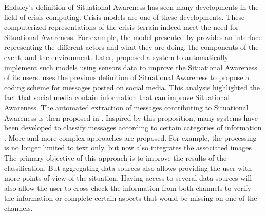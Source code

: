 Endsley's definition of Situational Awareness has seen many developments in the field of crisis computing.
Crisis models are one of these developments.
These computerized representations of the crisis terrain indeed meet the need for Situational Awareness.
For example, the model presented by \textcite{benabenMetamodelItsOntology2008} provides an interface representing the different actors and what they are doing, the components of the event, and the environment.
Later, \textcite{fertierRealtimeDataExploitation2020} proposed a system to automatically implement such models using sensors data to improve the Situational Awareness of its users.
\textcite{viewegSituationalAwarenessMass2012} uses the previous definition of Situational Awareness to propose a coding scheme for messages posted on social media.
This analysis highlighted the fact that social media contain information that can improve Situational Awareness.
The automated extraction of messages contributing to Situational Awareness is then proposed in \textcite{vermaNaturalLanguageProcessing2011}.
Inspired by this proposition, many systems have been developed to classify messages according to certain categories of information \parencite{carageaClassifyingTextMessages2011, imranAIDRArtificialIntelligence2014,ashktorabTweedrMiningTwitter2014}.
More and more complex approaches are proposed.
For example, the processing is no longer limited to text only, but now also integrates the associated images \textcite{alamImage4ActOnlineSocial2017}.
The primary objective of this approach is to improve the results of the classification.
But aggregating data sources also allows providing the user with more points of view of the situation.
Having access to several data sources will also allow the user to cross-check the information from both channels to verify the information or complete certain aspects that would be missing on one of the channels.

